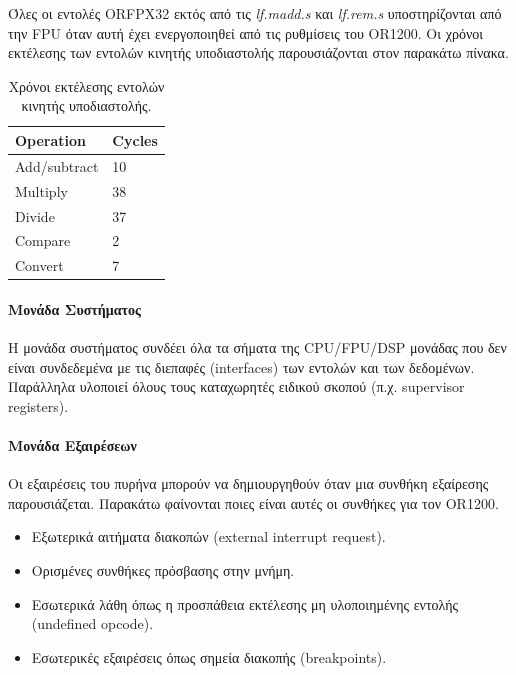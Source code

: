 \documentclass[a4paper,10pt]{article}
\numberwithin{figure}{section}
\numberwithin{table}{section}
\begin{document}
Όλες οι εντολές ORFPX32 εκτός από τις \emph{lf.madd.s} και \emph{lf.rem.s} υποστηρίζονται από την FPU όταν
αυτή έχει ενεργοποιηθεί από τις ρυθμίσεις του OR1200. Οι χρόνοι εκτέλεσης των εντολών κινητής υποδιαστολής παρουσιάζονται στον παρακάτω πίνακα.
\newpage
{%
\newcommand{\mc}[3]{\multicolumn{#1}{#2}{#3}}
\begin{table}[h!]
\begin{center}
\begin{tabular}{|l|l|}\hline
\rowcolor{tcA}
Operation & Cycles\\\hline
Add/subtract & 10\\\hline
Multiply & 38\\\hline
Divide & 37\\\hline
Compare & 2\\\hline
Convert & 7\\\hline
\end{tabular}
\end{center}
\caption{Χρόνοι εκτέλεσης εντολών κινητής υποδιαστολής.}
\end{table}

}%


\paragraph{Μονάδα Συστήματος\newline\newline}

Η μονάδα συστήματος συνδέει όλα τα σήματα της CPU/FPU/DSP μονάδας που δεν είναι συνδεδεμένα
με τις διεπαφές (interfaces) των εντολών και των δεδομένων. Παράλληλα υλοποιεί όλους τους καταχωρητές ειδικού σκοπού (π.χ. supervisor registers).

\paragraph{Μονάδα Εξαιρέσεων \newline\newline}

Οι εξαιρέσεις του πυρήνα μπορούν να δημιουργηθούν όταν μια συνθήκη εξαίρεσης παρουσιάζεται. Παρακάτω φαίνονται ποιες είναι αυτές
οι συνθήκες για τον OR1200.

\begin{itemize}
 \item Εξωτερικά αιτήματα διακοπών (external interrupt request).
 \item Ορισμένες συνθήκες πρόσβασης στην μνήμη.
 \item Εσωτερικά λάθη όπως η προσπάθεια εκτέλεσης μη υλοποιημένης εντολής (undefined opcode).
 \item Εσωτερικές εξαιρέσεις όπως σημεία διακοπής (breakpoints).
\end{itemize}
\end{document}
